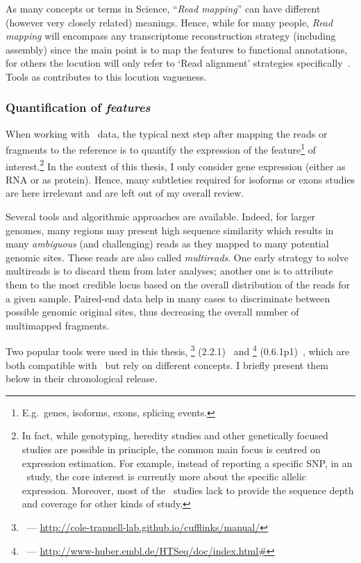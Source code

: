 As many concepts or terms in Science, \enquote{\emph{Read mapping}} can
have different (however very closely related) meanings.
Hence, while for many people, \emph{Read mapping} will encompass any
transcriptome reconstruction strategy (including  assembly) since
the main point is to map the features to functional annotations,
for others the locution will only refer to
`Read alignment' strategies specifically~.
Tools as  contributes to this locution vagueness.\mybr\

\subsubsection{Quantification of \emph{features}}\label{subsubsec:rnaseqQuant}

When working with \Rnaseq\ data, the typical next step after mapping the reads or
fragments to the reference is to quantify the expression of the
feature\footnote{E.g.\ genes, isoforms, exons, splicing events.}
of interest.\footnote{In fact, while genotyping, heredity
studies and other genetically focused studies are possible in principle, the common
main focus is centred on expression estimation. For example, instead of
reporting a specific \gls{SNP}, in an \Rnaseq\ study, the core interest is
currently more about the specific allelic expression. Moreover, most of the \Rnaseq\
studies lack to provide the sequence depth and coverage for other kinds of study.}
In the context of this thesis, I only consider gene expression (either as \gls{RNA}
or as protein). Hence, many subtleties required for isoforms or exons studies are
here irrelevant and are left out of my overall review.\mybr\

Several tools and algorithmic approaches are available.
Indeed, for larger genomes, many regions may present high sequence similarity
which results in many \emph{ambiguous} (and challenging) reads as they mapped to
many potential genomic sites. These reads are also called \emph{multireads}.
One early strategy to solve multireads is to discard them from later analyses;
another one is to attribute them to the most credible locus based on
the overall distribution of the reads for a given sample. 
Paired-end data help in many cases to discriminate between possible genomic
original sites, thus decreasing the overall number of multimapped fragments.\mybr\

Two popular tools were used in this thesis,
\cuffl\footnote{\cuffl\ ---
\href{http://cole-trapnell-lab.github.io/ufflinks/manual/}%
{http://cole-trapnell-lab.github.io/cufflinks/manual/}} (2.2.1)~ and
\htseq\footnote{\htseq\ ---
\href{http://www-huber.embl.de/HTSeq/doc/index.html\#}%
{http://www-huber.embl.de/HTSeq/doc/index.html\#}} (0.6.1p1)~,
which are both compatible with \toph\ but rely on different concepts.
I briefly present them below in their chronological release.\mybr\

